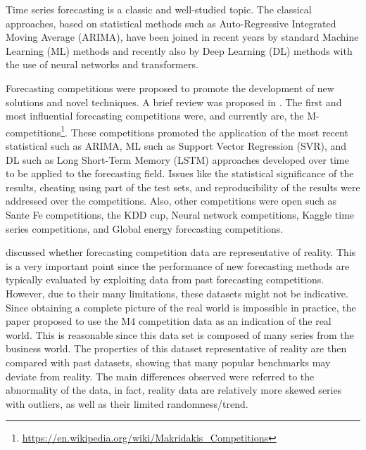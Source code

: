 Time series forecasting is a classic and well-studied topic.
The classical approaches, based on statistical methods such as Auto-Regressive Integrated Moving Average (ARIMA), have been joined in recent years by standard Machine Learning (ML) methods and recently also by Deep Learning (DL) methods with the use of neural networks and transformers.

Forecasting competitions were proposed to promote the development of new solutions and novel techniques.
A brief review was proposed in \cite{HYNDMAN20207}.
The first and most influential forecasting competitions were, and currently are, the M-competitions\footnote{ \url{https://en.wikipedia.org/wiki/Makridakis_Competitions} }.
These competitions promoted the application of the most recent statistical such as ARIMA, ML such as Support Vector Regression (SVR), and DL such as Long Short-Term Memory (LSTM) approaches developed over time to be applied to the forecasting field.
Issues like the statistical significance of the results, cheating using part of the test sets, and reproducibility of the results were addressed over the competitions.
Also, other competitions were open such as Sante Fe competitions, the KDD cup, Neural network competitions, Kaggle time series competitions, and Global energy forecasting competitions.

\cite{SPILIOTIS202037} discussed whether forecasting competition data are representative of reality.
This is a very important point since the performance of new forecasting methods are typically evaluated by exploiting data from past forecasting competitions.
However, due to their many limitations, these datasets might not be indicative.
Since obtaining a complete picture of the real world is impossible in practice, the paper proposed to use the M4 competition data as an indication of the real world.
This is reasonable since this data set is composed of many series from the business world.
The properties of this dataset representative of reality are then compared with past datasets, showing that many popular benchmarks may deviate from reality.
The main differences observed were referred to the abnormality of the data, in fact, reality data are relatively more skewed series with outliers, as well as their limited randomness\slash trend.


